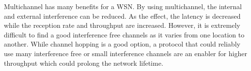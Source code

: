 
Multichannel has many benefits for a WSN. By using multichannel, the internal and external interference can be reduced. As the effect, the latency is decreased while the reception rate and throughput are increased.
However, it is extremely difficult to find a good interference free channels as it varies from one location to another. While channel hopping is a good option, a protocol that could reliably use many interference free or small interference channels are an enabler for higher throughput which could prolong the network lifetime.






